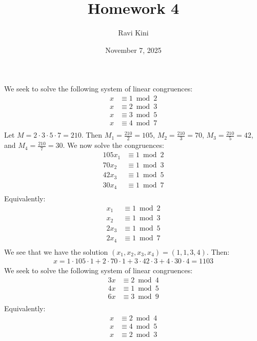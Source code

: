 \documentclass{article}
\title{Homework 4}
\author{Ravi Kini}
\date{November 7, 2025}
\begin{document}
\maketitle

\problem{}
We seek to solve the following system of linear congruences:
\begin{align*}
    x & \equiv 1 \bmod 2 \\
    x & \equiv 2 \bmod 3 \\
    x & \equiv 3 \bmod 5 \\
    x & \equiv 4 \bmod 7 \\
\end{align*}
Let $M = 2 \cdot 3 \cdot 5 \cdot 7 = 210$. Then $M_1 = \frac{210}{2} = 105$, $M_2 = \frac{210}{3} = 70$, $M_3 = \frac{210}{5} = 42$, and $M_4 = \frac{210}{7} = 30$. We now solve the congruences:
\begin{align*}
    105x_1 & \equiv 1 \bmod 2 \\
    70x_2 & \equiv 1 \bmod 3 \\
    42x_3 & \equiv 1 \bmod 5 \\
    30x_4 & \equiv 1 \bmod 7 \\ 
\end{align*}
Equivalently:
\begin{align*}
    x_1 & \equiv 1 \bmod 2 \\
    x_2 & \equiv 1 \bmod 3 \\
    2x_3 & \equiv 1 \bmod 5 \\
    2x_4 & \equiv 1 \bmod 7 \\   
\end{align*}
We see that we have the solution $(x_1, x_2, x_3, x_4) = (1, 1, 3, 4)$. Then:
\begin{align*}
    x = 1 \cdot 105 \cdot 1 + 2 \cdot 70 \cdot 1 + 3 \cdot 42 \cdot 3 + 4 \cdot 30 \cdot 4 = 1103
\end{align*}
We seek to solve the following system of linear congruences:
\begin{align*}
    3x & \equiv 2 \bmod 4 \\
    4x & \equiv 1 \bmod 5 \\
    6x & \equiv 3 \bmod 9 \\
\end{align*}
Equivalently:
\begin{align*}
    x & \equiv 2 \bmod 4 \\
    x & \equiv 4 \bmod 5 \\
    x & \equiv 2 \bmod 3 \\
\end{align*}
\end{document}
